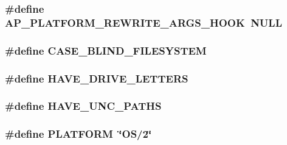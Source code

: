 \subsubsection[{\texorpdfstring{A\+P\+\_\+\+P\+L\+A\+T\+F\+O\+R\+M\+\_\+\+R\+E\+W\+R\+I\+T\+E\+\_\+\+A\+R\+G\+S\+\_\+\+H\+O\+OK}{AP_PLATFORM_REWRITE_ARGS_HOOK}}]{\setlength{\rightskip}{0pt plus 5cm}\#define A\+P\+\_\+\+P\+L\+A\+T\+F\+O\+R\+M\+\_\+\+R\+E\+W\+R\+I\+T\+E\+\_\+\+A\+R\+G\+S\+\_\+\+H\+O\+OK~{\bf N\+U\+LL}}\hypertarget{group__APACHE__OS__OS2_gafadf468b66524ea08fc3536aead78644}{}\label{group__APACHE__OS__OS2_gafadf468b66524ea08fc3536aead78644}
\subsubsection[{\texorpdfstring{C\+A\+S\+E\+\_\+\+B\+L\+I\+N\+D\+\_\+\+F\+I\+L\+E\+S\+Y\+S\+T\+EM}{CASE_BLIND_FILESYSTEM}}]{\setlength{\rightskip}{0pt plus 5cm}\#define C\+A\+S\+E\+\_\+\+B\+L\+I\+N\+D\+\_\+\+F\+I\+L\+E\+S\+Y\+S\+T\+EM}\hypertarget{group__APACHE__OS__OS2_ga34e00ba2dd9716e8d7f289bf66ce53b6}{}\label{group__APACHE__OS__OS2_ga34e00ba2dd9716e8d7f289bf66ce53b6}
\subsubsection[{\texorpdfstring{H\+A\+V\+E\+\_\+\+D\+R\+I\+V\+E\+\_\+\+L\+E\+T\+T\+E\+RS}{HAVE_DRIVE_LETTERS}}]{\setlength{\rightskip}{0pt plus 5cm}\#define H\+A\+V\+E\+\_\+\+D\+R\+I\+V\+E\+\_\+\+L\+E\+T\+T\+E\+RS}\hypertarget{group__APACHE__OS__OS2_ga3637584fee051a4684a19e7ed959ea69}{}\label{group__APACHE__OS__OS2_ga3637584fee051a4684a19e7ed959ea69}
\subsubsection[{\texorpdfstring{H\+A\+V\+E\+\_\+\+U\+N\+C\+\_\+\+P\+A\+T\+HS}{HAVE_UNC_PATHS}}]{\setlength{\rightskip}{0pt plus 5cm}\#define H\+A\+V\+E\+\_\+\+U\+N\+C\+\_\+\+P\+A\+T\+HS}\hypertarget{group__APACHE__OS__OS2_ga9a257956274b28146a5ba329f58db900}{}\label{group__APACHE__OS__OS2_ga9a257956274b28146a5ba329f58db900}
\subsubsection[{\texorpdfstring{P\+L\+A\+T\+F\+O\+RM}{PLATFORM}}]{\setlength{\rightskip}{0pt plus 5cm}\#define P\+L\+A\+T\+F\+O\+RM~\char`\"{}OS/2\char`\"{}}\hypertarget{group__APACHE__OS__OS2_ga1fa4f1561216be34f745f32aaa38d943}{}\label{group__APACHE__OS__OS2_ga1fa4f1561216be34f745f32aaa38d943}
